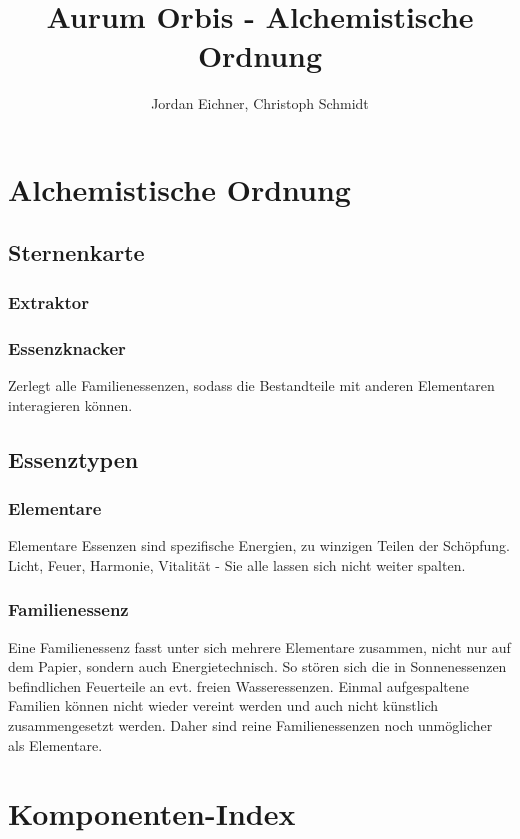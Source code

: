 \documentclass[a4paper,12pt,oneside]{book}
\title{Aurum Orbis - Alchemistische Ordnung}
\author{Jordan Eichner, Christoph Schmidt}
\date{}
\begin{document}
\maketitle
\tableofcontents

\part{Alchemistische Ordnung}

\chapter{Sternenkarte}

\section{Extraktor}

\section{Essenzknacker}
Zerlegt alle Familienessenzen, sodass die Bestandteile mit anderen Elementaren interagieren können.


\chapter{Essenztypen}

\section{Elementare}
Elementare Essenzen sind spezifische Energien, zu winzigen Teilen der Schöpfung. Licht, Feuer, Harmonie, Vitalität - Sie alle lassen sich nicht weiter spalten. 

\section{Familienessenz}
Eine Familienessenz fasst unter sich mehrere Elementare zusammen, nicht nur auf dem Papier, sondern auch Energietechnisch. So stören sich die in Sonnenessenzen befindlichen Feuerteile an evt. freien Wasseressenzen. Einmal aufgespaltene Familien können nicht wieder vereint werden und auch nicht künstlich zusammengesetzt werden. Daher sind reine Familienessenzen noch unmöglicher als Elementare.

\part{Komponenten-Index}
\end{document}
